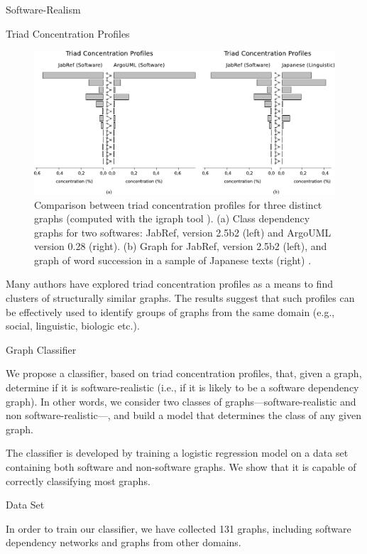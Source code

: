 \documentclass[11pt,twocolumn,a4paper,english]{article}
\begin{document}
\begin{section}{Software-Realism}
\begin{subsection}{Triad Concentration Profiles}
	\begin{figure}[htbp]
		\centering
			\includegraphics[scale=1]{figures/tcp}
		\caption{Comparison between triad concentration profiles for three distinct graphs (computed with the igraph tool \cite{igraph}). (a) Class dependency graphs for two softwares: JabRef, version 2.5b2 (left) and ArgoUML version 0.28 (right). (b) Graph for JabRef, version 2.5b2 (left), and graph of word succession in a sample of Japanese texts (right) \cite{Milo2004}.}
		\label{fig:tcp}
	\end{figure}
	
	Many authors \cite{Milo2004,Ma2007,Lin2008} have explored triad concentration profiles as a means to find clusters of structurally similar graphs. The results suggest that such profiles can be effectively used to identify groups of graphs from the same domain (e.g., social, linguistic, biologic etc.).
			
\end{subsection}

\begin{subsection}{Graph Classifier}

We propose a classifier, based on triad concentration profiles, that, given a graph, determine if it is software-realistic (i.e., if it is likely to be a software dependency graph). In other words, we consider two classes of graphs---software-realistic and non software-realistic---, and build a model that determines the class of any given graph. 

The classifier is developed by training a logistic regression model on a data set containing both software and non-software graphs. We show that it is capable of correctly classifying most graphs.

\begin{subsubsection}{Data Set} \label{sec:data-set}
	
	In order to train our classifier, we have collected 131 graphs, including software dependency networks and graphs from other domains.
	

\end{subsubsection}
\end{subsection}
\end{section}
\end{document}

